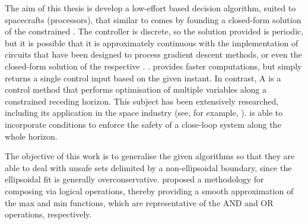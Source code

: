 
The aim of this thesis is develop a low-effort  based decision algorithm, suited to spacecrafts (processors), that similar to \cite{matias2025hybrid, reis2020control} comes by founding a closed-form solution of the constrained . The controller is discrete, so the solution provided is periodic, but it is possible that it is approximately continuous with the implementation of circuits that have been designed to process gradient descent methods, or even the closed-form solution of the respective . \cite{hao2025analysis}.
 provides faster computations, but simply returns a single control input based on the given instant. In contrast, A  is a control method that performs optimisation of multiple variables along a constrained receding horizon. This subject has been extensively researched, including its application in the space industry (see, for example, \cite{hartley2015tutorial, kaczmarek2023autonomous}).  is able to incorporate  conditions to enforce the safety of a close-loop system \cite{grandia2021multi} along the whole horizon.

The objective of this work is to generalise the given algorithms so that they are able to deal with unsafe sets delimited by a non-ellipsoidal boundary, since the ellipsoidal fit is generally overconservative. \cite{molnar2023composing}  proposed a methodology for composing  via logical operations, thereby  providing a smooth approximation of the max and min functions, which are representative of the AND and OR operations, respectively.  

